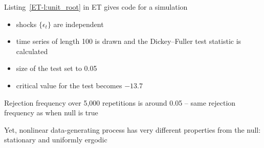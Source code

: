 \begin{frame}

    \vspace{2em}
    Listing~\ref{ET-l:unit_root} in ET gives code for a simulation 
    \begin{itemize}
        \item  shocks $\{\epsilon_t\}$ are independent
        \item time series of length 100 is drawn and the
    Dickey--Fuller test statistic is calculated
        \item  size of the test set to
    0.05
        \item critical value for the test becomes $-13.7$
    \end{itemize}
     
    Rejection frequency over 5,000 repetitions is around
    0.05  -- same rejection frequency as when null is true
    
    \vspace{.7em}
    Yet, nonlinear data-generating process has
    very different properties from the null:  stationary and uniformly ergodic
    
\end{frame}



